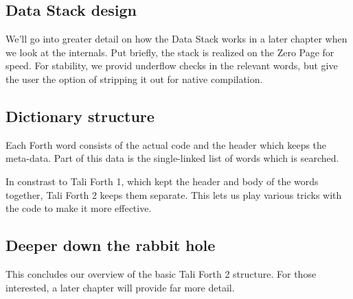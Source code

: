 \subsection{Data Stack design}

We'll go into greater detail on how the Data Stack works in a later chapter when
we look at the internals. Put briefly, the stack is realized on the Zero
Page for speed. For stability, we provid underflow
checks in the relevant words, but give the user the
option of stripping it out for native compilation.


\subsection{Dictionary structure}

Each Forth word consists of the actual code and the header which
keeps the meta-data. Part of this data is the single-linked list of words which
is searched. 

In constrast to Tali Forth 1, which kept the header and body
of the words together, Tali Forth 2 keeps them separate. This lets us play
various tricks with the code to make it more effective.

\subsection{Deeper down the rabbit hole}

This concludes our overview of the basic Tali Forth 2 structure. For those
interested, a later chapter will provide far more detail.
